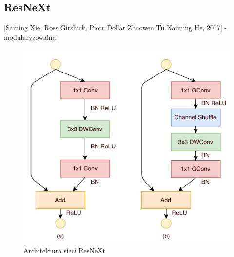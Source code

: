 \documentclass[12pt,a4paper,twoside,titlepage,openright]{book}
\begin{document}
\subsection{ResNeXt}
[Saining Xie, Ross Girshick, Piotr Dollar Zhuowen Tu Kaiming He, 2017] - modularyzowalna 
\cite{DBLP:journals/corr/XieGDTH16}
\begin{figure}[h]
	\centering
			\includegraphics[resolution=120]{ResNeXt.png}
		\caption{Architektura sieci ResNeXt}
\end{figure}
\end{document}
